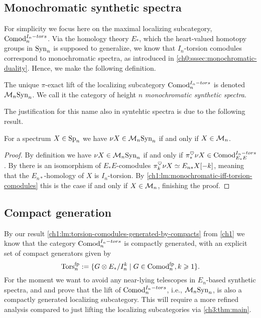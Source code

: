 \subsection{Monochromatic synthetic spectra}

For simplicity we focus here on the maximal localizing subcategory, $\mathrm{Comod}_n^{I_n-tors}$. Via the homology theory $E_*$, which the heart-valued homotopy groups in $\mathrm{Syn}_n$ is supposed to generalize, we know that $I_n$-torsion comodules correspond to monochromatic spectra, as introduced in \cref{ch0:sssec:monochromatic-duality}. Hence, we make the following definition. 

\begin{definition}
    The unique $\pi$-exact lift of the localizing subcategory $\mathrm{Comod}_n^{I_n-tors}$ is denoted $\mathcal{M}_{n}\mathrm{Syn}_n$. We call it the category of height $n$ \emph{monochromatic synthetic spectra}. 
\end{definition}

The justification for this name also in syntehtic spectra is due to the following result. 

\begin{lemma}
    \label{ch3:add:lm:mono-iff-syn-mono}
    For a spectrum $X\in \mathrm{Sp}_{n}$ we have $\nu X \in \mathcal{M}_{n}\mathrm{Syn}_n$ if and only if $X\in \mathcal{M}_{n}$. 
\end{lemma}
\begin{proof}
    By definition we have $\nu X \in \mathcal{M}_{n}\mathrm{Syn}_n$ if and only if $\pi_*^\heartsuit \nu X \in \mathrm{Comod}_{E_*E}^{I_n-tors}$. By \cite[4.21, 4.22]{pstragowski_2022} there is an isomorphism of $E_*E$-comodules $\pi_k^\heartsuit \nu X \simeq E_{n*} X[-k]$, meaning that the $E_{n*}$-homology of $X$ is $I_n$-torsion. By \cref{ch1:lm:monochromatic-iff-torsion-comodules} this is the case if and only if $X\in \mathcal{M}_{n}$, finishing the proof. 
\end{proof}










\subsection{Compact generation}

By our result \cref{ch1:lm:torsion-comodules-generated-by-compacts} from \cref{ch1} we know that the category $\mathrm{Comod}_n^{I_n-tors}$ is compactly generated, with an explicit set of compact generators given by 
\[\mathrm{Tors}_n^{\mathrm{fp}} := \{G\otimes E_*/I_n^k \mid G\in \mathrm{Comod}_n^{\mathrm{fp}}, k\geqslant 1\}.\]
For the moment we want to avoid any near-lying telescopes in $E_n$-based synthetic spectra, and and prove that the lift of $\mathrm{Comod}_n^{I_n-tors}$, i.e., $\mathcal{M}_{n}\mathrm{Syn}_n$, is also a compactly generated localizing subcategory. This will require a more refined analysis compared to just lifting the localizing subcategories via \cref{ch3:thm:main}. 

